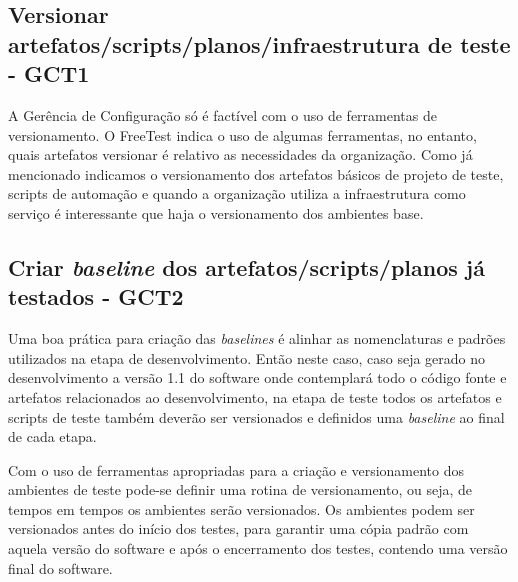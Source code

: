 

\subsection{Versionar artefatos/scripts/planos/infraestrutura de teste - GCT1}
\label{sec:guiagct1}

A Gerência de Configuração só é factível com o uso de ferramentas de versionamento. O FreeTest indica o uso de algumas ferramentas, no entanto, quais artefatos versionar é relativo as necessidades da organização. Como já mencionado indicamos o versionamento dos artefatos básicos de projeto de teste, scripts de automação e quando a organização utiliza a infraestrutura como serviço é interessante que haja o versionamento dos ambientes base.

\subsection{Criar \textit{baseline} dos artefatos/scripts/planos já testados - GCT2}
\label{sec:guiagct2}

Uma boa prática para criação das \textit{baselines} é alinhar as nomenclaturas e padrões utilizados na etapa de desenvolvimento. Então neste caso, caso seja gerado no desenvolvimento a versão 1.1 do software onde contemplará todo o código fonte e artefatos relacionados ao desenvolvimento, na etapa de teste todos os artefatos e scripts de teste também deverão ser versionados e definidos uma \textit{baseline} ao final de cada etapa.

Com o uso de ferramentas apropriadas para a criação e versionamento dos ambientes de teste pode-se definir uma rotina de versionamento, ou seja, de tempos em tempos os ambientes serão versionados. Os ambientes podem ser versionados antes do início dos testes, para garantir uma cópia padrão com aquela versão do software e após o encerramento dos testes, contendo uma versão final do software.

